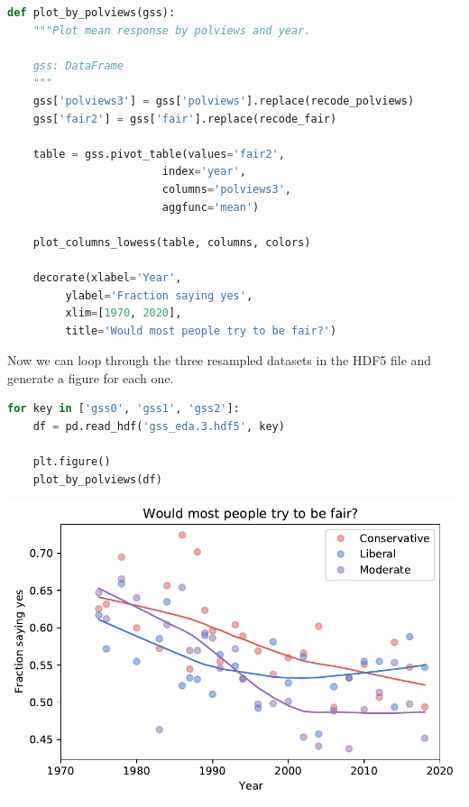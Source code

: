 \begin{lstlisting}[language=Python,style=source]
def plot_by_polviews(gss):
    """Plot mean response by polviews and year.
    
    gss: DataFrame
    """
    gss['polviews3'] = gss['polviews'].replace(recode_polviews)
    gss['fair2'] = gss['fair'].replace(recode_fair)
    
    table = gss.pivot_table(values='fair2', 
                        index='year', 
                        columns='polviews3', 
                        aggfunc='mean')

    plot_columns_lowess(table, columns, colors)

    decorate(xlabel='Year',
         ylabel='Fraction saying yes',
         xlim=[1970, 2020],
         title='Would most people try to be fair?')
\end{lstlisting}

Now we can loop through the three resampled datasets in the HDF5 file
and generate a figure for each one.

\begin{lstlisting}[language=Python,style=source]
for key in ['gss0', 'gss1', 'gss2']:
    df = pd.read_hdf('gss_eda.3.hdf5', key)

    plt.figure()
    plot_by_polviews(df)
\end{lstlisting}

\begin{center}
\includegraphics[scale=0.75]{03_outlook_files/03_outlook_60_0.pdf}
\end{center}

